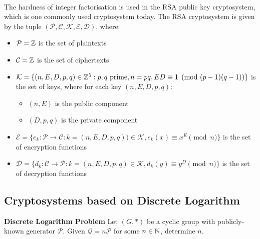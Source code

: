 \paragraph{}
The hardness of integer factorisation is used in the RSA public key cryptosystem, which is one commonly used cryptosystem today. The RSA cryptosystem is given by the tuple $(\mathcal{P}, \mathcal{C}, \mathcal{K}, \mathcal{E}, \mathcal{D})$, where:
\begin{itemize}
    \item $\mathcal{P} = \mathbb{Z}$ is the set of plaintexts
    \item $\mathcal{C} = \mathbb{Z}$ is the set of ciphertexts
    \item $\mathcal{K} = \{ (n, E, D, p, q) \in \mathbb{Z}^5 : p,q \text{ prime}, n = pq, ED \equiv 1 \pmod{(p-1)(q-1)} \}$ is the set of keys, where for each key $(n, E, D, p, q)$:
    \begin{itemize}
        \item $(n, E)$ is the public component
        \item $(D, p, q)$ is the private component
    \end{itemize}
    \item $\mathcal{E} = \{ e_k: \mathcal{P} \rightarrow \mathcal{C} : k = (n, E, D, p, q)) \in \mathcal{K}, e_k(x) \equiv x^E \pmod{n} \}$ is the set of encryption functions
    \item $\mathcal{D} = \{ d_k: \mathcal{C} \rightarrow \mathcal{P} : k = (n, E, D, p, q) \in \mathcal{K}, d_k(y) \equiv y^D \pmod{n} \}$ is the set of decryption functions
\end{itemize}

\subsection{Cryptosystems based on Discrete Logarithm}

\theoremstyle{definition}
\begin{definition}{\textbf{Discrete Logarithm Problem}}
Let $(G, *)$ be a cyclic group with publicly-known generator $\mathcal{P}$. Given $\mathcal{Q} = n\mathcal{P}$ for some $n \in \mathbb{N}$, determine $n$.
\end{definition}

